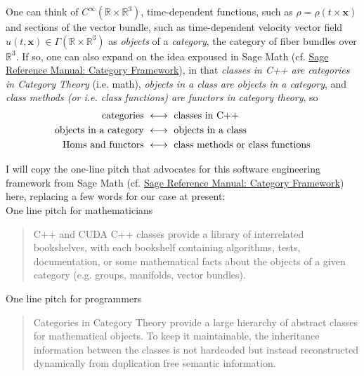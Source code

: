 \documentclass[10pt]{amsart}
\begin{document}
One can think of $C^{\infty}(\mathbb{R}\times \mathbb{R}^3)$, time-dependent functions, such as $\rho = \rho(t\times \mathbf{x})$ and sections of the vector bundle, such as time-dependent velocity vector field $u(t,\mathbf{x}) \in \Gamma(\mathbb{R}\times \mathbb{R}^3)$ as \emph{objects} of a \emph{category}, the category of fiber bundles over $\mathbb{R}^3$.  If so, one can also expand on the idea expoused in Sage Math (cf. \href{http://doc.sagemath.org/pdf/en/reference/categories/categories.pdf}{Sage Reference Manual: Category Framework}), in that \emph{classes in C++ are categories in Category Theory} (i.e. math), \emph{objects in a class are objects in a category}, and \emph{class methods (or i.e. class functions) are functors in category theory}, so
\[
\begin{aligned}
  \text{ categories } & \longleftrightarrow  \text{ classes in C++ }  \\
  \text{ objects in a category } & \longleftrightarrow \text{ objects in a class } \\
  \text{ \text{Hom}s and functors } & \longleftrightarrow \text{ class methods or class functions }
\end{aligned}
\]

I will copy the one-line pitch that advocates for this software engineering framework from Sage Math (cf. \href{http://doc.sagemath.org/pdf/en/reference/categories/categories.pdf}{Sage Reference Manual: Category Framework}) here, replacing a few words for our case at present: \\

  One line pitch for mathematicians \\

\begin{quote} C++ and CUDA C++ classes provide a library of interrelated bookshelves, with each bookshelf containing algorithms,  tests, documentation, or some mathematical facts about the objects of a given category (e.g. groups, manifolds, vector bundles). \end{quote} 

One line pitch for programmers  \\

\begin{quote} Categories in Category Theory provide a large hierarchy of abstract classes for mathematical objects. To keep it maintainable, the inheritance information between the classes is not hardcoded but instead reconstructed dynamically from duplication free semantic information. \end{quote} 
\end{document}
